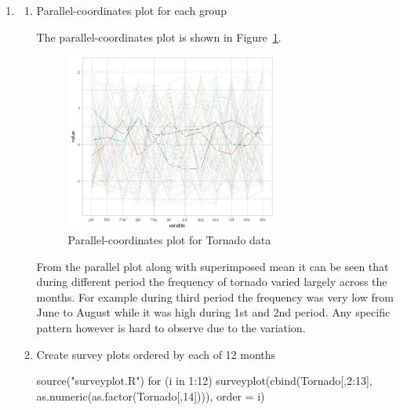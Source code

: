 \documentclass{article}
\begin{document}
\begin{enumerate}[leftmargin = 0 em, label = \arabic*., font = \bfseries]
\begin{enumerate}
\newpage
		\item 
		\begin{enumerate}
			\item 
			Parallel-coordinates plot for each group
			The parallel-coordinates plot is shown in Figure~\ref{3bi}.
		\begin{figure}[!htb]
			\centering
			\includegraphics[width = 0.7\textwidth]{3bi.jpeg}
			\caption{Parallel-coordinates plot for Tornado data}
			\label{3bi}
		\end{figure}
		From the parallel plot along with superimposed mean it can be seen that during different period the frequency of tornado varied largely across the months. For example during third period the frequency was very low from June to August while it was high during 1st and 2nd period. Any specific pattern however is hard to observe due to the variation.

\newpage
		\item 
		Create survey plots ordered by each of 12 months
		\begin{rcode}
source("surveyplot.R")
for (i in 1:12){
  surveyplot(cbind(Tornado[,2:13], as.numeric(as.factor(Tornado[,14]))), order = i)}	
		\end{rcode}
        

\end{enumerate}
\end{enumerate}
\end{enumerate}
\end{document}
